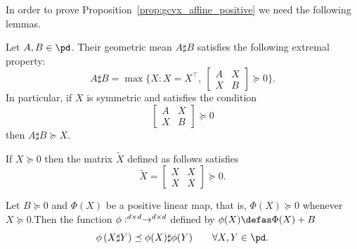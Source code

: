 \documentclass[twoside,11pt]{article}
\begin{document}
In order to prove Proposition~\ref{prop:gcvx_affine_positive}
we need the following lemmas.



\begin{lemma}\label{lemma:extremal_characterization}
        Let $A, B \in \pd$. Their geometric mean $A \sharp B$ satisfies the following extremal property: 
        \[
        A \sharp B = \max \{X: X = X^\top, \ \begin{bmatrix}
            A &X \\
            X &B
        \end{bmatrix} \succeq 0\}.
        \]
        In particular, if $X$ is symmetric and satisfies the condition 
        \[
        \begin{bmatrix}
            A &X \\
            X &B
        \end{bmatrix} \succeq 0
        \]
        then $A \sharp B \succeq X$.
    \end{lemma}


\begin{lemma}\label{lemma:psd_block_matrix}
        If $X \succeq 0$ then the matrix $\tilde{X}$ defined as follows satisfies 
        \[
        \tilde{X} = \begin{bmatrix}
            X & X  \\
            X & X
        \end{bmatrix} \succeq 0.
        \]
    \end{lemma}

\begin{lemma}\label{positive_linear_gm}
        Let $B \succeq 0$ and $\Phi(X)$ be a positive linear map, that is, $\Phi(X) \succeq 0 $ whenever $X \succeq 0$.Then the function $\phi: \real^{d \times d} \to \real^{d \times d}$ defined by $\phi(X) \defas \Phi(X) + B$
        \[
        \phi\left(X \sharp Y\right) \preceq \phi(X) \sharp \phi(Y) \qquad \forall X,Y \in \pd.
        \]
    \end{lemma}
\end{document}
